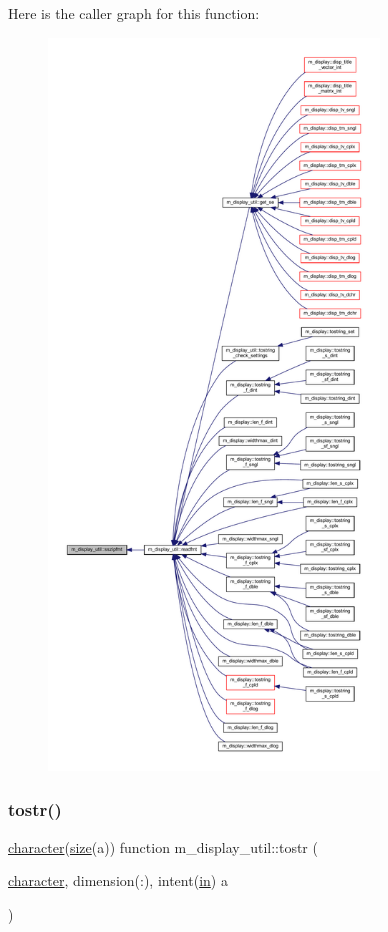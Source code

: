 Here is the caller graph for this function\+:
\nopagebreak
\begin{figure}[H]
\begin{center}
\leavevmode
\includegraphics[height=550pt]{namespacem__display__util_a3fa60429ffcc82a33032d718cbe03e87_icgraph}
\end{center}
\end{figure}
\mbox{\label{namespacem__display__util_ae2d4ae17104c7a91b0a3e4962e3af54a}} 
\subsubsection{\texorpdfstring{tostr()}{tostr()}}
{\footnotesize\ttfamily \hyperlink{option__stopwatch_83_8txt_abd4b21fbbd175834027b5224bfe97e66}{character}(\hyperlink{what__overview_81_8txt_ab5692ed87074f1d5ec850a9ffa8b5af9}{size}(a)) function m\+\_\+display\+\_\+util\+::tostr (\begin{DoxyParamCaption}\item[{\hyperlink{option__stopwatch_83_8txt_abd4b21fbbd175834027b5224bfe97e66}{character}, dimension(\+:), intent(\hyperlink{M__journal_83_8txt_afce72651d1eed785a2132bee863b2f38}{in})}]{a }\end{DoxyParamCaption})\hspace{0.3cm}{\ttfamily [private]}}

